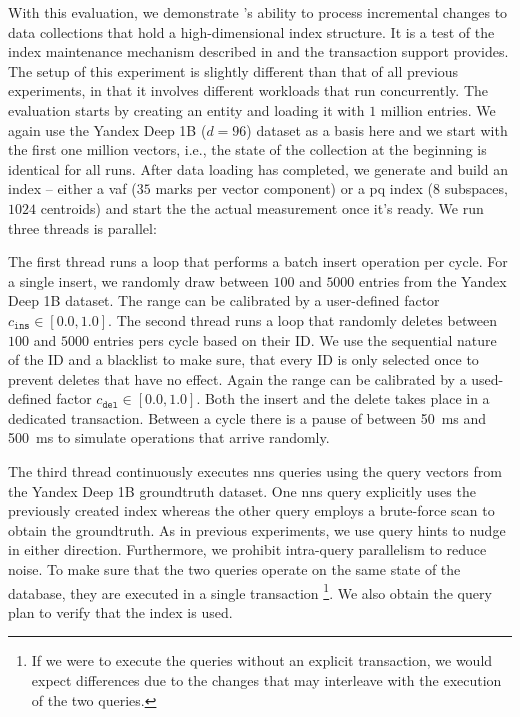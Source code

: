 With this evaluation, we demonstrate \cottontail{}'s ability to process incremental changes to data collections that hold a high-dimensional index structure. It is a test of the index maintenance mechanism described in  and the transaction support \cottontail{} provides. The setup of this experiment is slightly different than that of all previous experiments, in that it involves different workloads that run concurrently. The evaluation starts by creating an entity and loading it with $1$ million entries. We again use the Yandex Deep 1B ($d = 96$) dataset as a basis here and we start with the first one million vectors, i.e., the state of the collection at the beginning is identical for all runs. After data loading has completed, we generate and build an index -- either a \acrshort{vaf} ($35$ marks per vector component) or a \acrshort{pq} index ($8$ subspaces, $1024$ centroids) and start the the actual measurement once it's ready. We run three threads is parallel: 

The first thread runs a loop that performs a batch insert operation per cycle. For a single insert, we randomly draw between $100$ and $5000$ entries from the Yandex Deep 1B dataset. The range can be calibrated by a user-defined factor $c_{\texttt{ins}} \in [0.0, 1.0]$. The second thread runs a loop that randomly deletes between $100$ and $5000$ entries pers cycle based on their ID. We use the sequential nature of the ID and a blacklist to make sure, that every ID is only selected once to prevent deletes that have no effect. Again the range can be calibrated by a used-defined factor $c_{\texttt{del}} \in [0.0, 1.0]$. Both the insert and the delete takes place in a dedicated transaction. Between a cycle there is a pause of between \SI{50}{\milli\second} and \SI{500}{\milli\second} to simulate operations that arrive randomly.

The third thread continuously executes \acrshort{nns} queries using the query vectors from the  Yandex Deep 1B groundtruth dataset. One \acrshort{nns} query explicitly uses the previously created index whereas the other query employs a brute-force scan to obtain the groundtruth. As in previous experiments, we use query hints to nudge \cottontail{} in either direction. Furthermore, we prohibit intra-query parallelism to reduce noise. To make sure that the two queries operate on the same state of the database, they are executed in a single transaction \footnote{If we were to execute the queries without an explicit transaction, we would expect differences due to the changes that may interleave with the execution of the two queries.}. We also obtain the query plan to verify that the index is used. 

